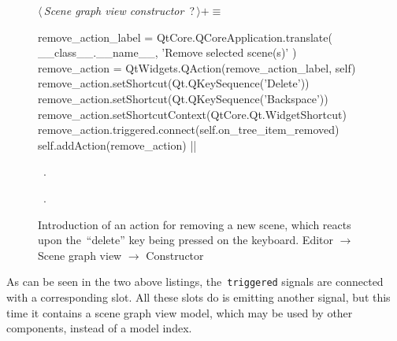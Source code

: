 \documentclass[%
    a4paper,    %
    justified,  %
    nobib,      %
    openany     %
]{tufte-book}
\begin{document}
\begin{figure}
\begin{flushleft} \small
\begin{minipage}{\linewidth}\label{scrap48}\raggedright\small
{} $\langle\,${\itshape Scene graph view constructor}\nobreak\ {\footnotesize {?}}$\,\rangle+\equiv$
\vspace{-1ex}
\begin{pythoncode}
    remove_action_label = QtCore.QCoreApplication.translate(
        __class__.__name__, 'Remove selected scene(s)'
    )
    remove_action = QtWidgets.QAction(remove_action_label, self)
    remove_action.setShortcut(Qt.QKeySequence('Delete'))
    remove_action.setShortcut(Qt.QKeySequence('Backspace'))
    remove_action.setShortcutContext(QtCore.Qt.WidgetShortcut)
    remove_action.triggered.connect(self.on_tree_item_removed)
    self.addAction(remove_action)
|\NWsep|
\end{pythoncode}
\vspace{1.5ex}
\footnotesize
\begin{list}{}{\setlength{\itemsep}{-\parsep}\setlength{\itemindent}{-\leftmargin}}
\item \NWtxtMacroDefBy\ .
\item \NWtxtMacroRefIn\ .

\item{}
\end{list}
\end{minipage}\vspace{4ex}
\end{flushleft}
\caption{Introduction of an action for removing a new scene, which reacts upon
  the~\enquote{delete} key being pressed on the keyboard.
  \newline{}\newline{}Editor $\rightarrow$ Scene graph view
  $\rightarrow$ Constructor}
\label{editor:lst:scene-graph-view:constructor:remove-action}
\end{figure}

As can be seen in the two above listings, the~\verb=triggered= signals are
connected with a corresponding slot. All these slots do is emitting another
signal, but this time it contains a scene graph view model, which may be used by
other components, instead of a model index.
\end{document}
